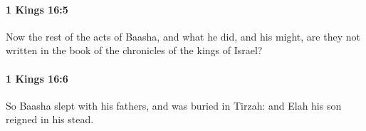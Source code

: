 		\paragraph{1 Kings 16:5} %
			\label{1KINGS-16-5}

			Now the rest of the acts of Baasha, and what he did, and his might, are they not written in the book of the chronicles of the kings of Israel?


		\paragraph{1 Kings 16:6} %
			\label{1KINGS-16-6}

			So Baasha slept with his fathers, and was buried in Tirzah: and Elah his son reigned in his stead.


